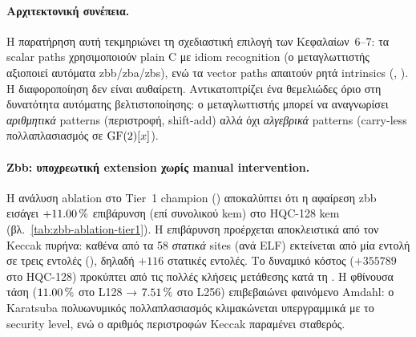 \paragraph{Αρχιτεκτονική συνέπεια.}
Η παρατήρηση αυτή τεκμηριώνει τη σχεδιαστική επιλογή των Κεφαλαίων~6–7:
τα scalar paths χρησιμοποιούν plain C με idiom recognition (ο μεταγλωττιστής
αξιοποιεί αυτόματα \gls{zbb}/\gls{zba}/\gls{zbs}), ενώ τα vector paths
απαιτούν ρητά intrinsics (,
). Η διαφοροποίηση δεν είναι
αυθαίρετη. Αντικατοπτρίζει ένα θεμελιώδες όριο στη δυνατότητα
αυτόματης βελτιστοποίησης: ο μεταγλωττιστής μπορεί να αναγνωρίσει
\emph{αριθμητικά} patterns (περιστροφή, shift-add) αλλά όχι
\emph{αλγεβρικά} patterns (carry-less πολλαπλασιασμός σε $\mathrm{GF}(2)[x]$).

\paragraph{Zbb: υποχρεωτική extension χωρίς manual intervention.}
Η ανάλυση ablation στο Tier~1 champion () αποκαλύπτει
ότι η αφαίρεση \gls{zbb} εισάγει $+\SI{11.00}{\percent}$ επιβάρυνση (επί συνολικού \gls{kem}) στο HQC-128 \gls{kem}
(βλ.\ \cref{tab:zbb-ablation-tier1}). Η επιβάρυνση προέρχεται
αποκλειστικά από τον Keccak πυρήνα: καθένα από τα \num{58} \emph{στατικά} \rori sites (ανά ELF) εκτείνεται από μία εντολή \rori σε τρεις εντολές
(), δηλαδή $+\num{116}$ στατικές εντολές. Το δυναμικό κόστος ($+\num{355789}$ \instret στο HQC-128) προκύπτει από τις πολλές κλήσεις μετάθεσης κατά τη \Decaps. Η φθίνουσα τάση ($\SI{11.00}{\percent}$ στο L128 →
$\SI{7.51}{\percent}$ στο L256) επιβεβαιώνει φαινόμενο Amdahl: ο Karatsuba
πολυωνυμικός πολλαπλασιασμός κλιμακώνεται υπεργραμμικά με το security
level, ενώ ο αριθμός περιστροφών Keccak παραμένει σταθερός.

